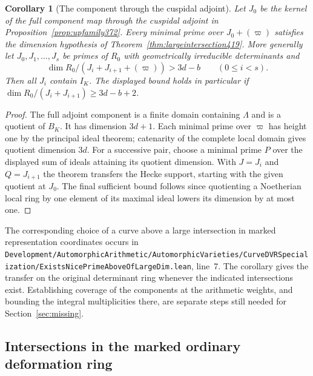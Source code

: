 \documentclass[a4paper,11pt]{article}
\newtheorem{corollary}[proposition]{Corollary}
\theoremstyle{definition}
\theoremstyle{remark}
\newcommand{\srcloc}[2]{{\small\nolinkurl{#1.lean}}, line~#2}
\numberwithin{equation}{section}
\begin{document}
\begin{corollary}[The component through the cuspidal adjoint]\leavevmode
\label{cor:componentgraph419}
Let \(J_0\) be the kernel of the full component map through
the cuspidal adjoint in Proposition~\ref{prop:upfamily372}.
Every minimal prime over \(J_0+(\varpi)\) satisfies the
dimension hypothesis of Theorem~\ref{thm:largeintersection419}.
More generally let \(J_0,J_1,\ldots,J_s\) be primes of
\(R_0\) with geometrically irreducible determinants and
\[
       \dim R_0/(J_i+J_{i+1}+(\varpi))>3d-b
                       \qquad (0\le i<s).
\]
Then all \(J_i\) contain \(I_K\). The displayed bound
holds in particular if \(\dim R_0/(J_i+J_{i+1})\ge 3d-b+2\).
\end{corollary}
\begin{proof}
The full adjoint component is a finite domain containing
\(\Lambda\) and is a quotient of \(B_K\). It has dimension
\(3d+1\). Each minimal prime over \(\varpi\) has height
one by the principal ideal theorem; catenarity of the
complete local domain gives quotient dimension \(3d\).
For a successive pair, choose a minimal prime \(P\) over
the displayed sum of ideals attaining its quotient dimension.
With \(J=J_i\) and \(Q=J_{i+1}\) the theorem transfers the
Hecke support, starting with the given quotient at \(J_0\).
The final sufficient bound follows since quotienting a
Noetherian local ring by one element of its maximal ideal
lowers its dimension by at most one.
\end{proof}

The corresponding choice of a curve above a large intersection
in marked representation coordinates occurs in
\srcloc{Development/AutomorphicArithmetic/AutomorphicVarieties/CurveDVRSpecialization/ExistsNicePrimeAboveOfLargeDim}{7}.
The corollary gives the transfer on the original determinant
ring whenever the indicated intersections exist. Establishing
coverage of the components at the arithmetic weights, and
bounding the integral multiplicities there, are separate
steps still needed for Section~\ref{sec:missing}.


\subsection{Intersections in the marked ordinary deformation ring}
\label{sec:markedintersections420}
\end{document}
